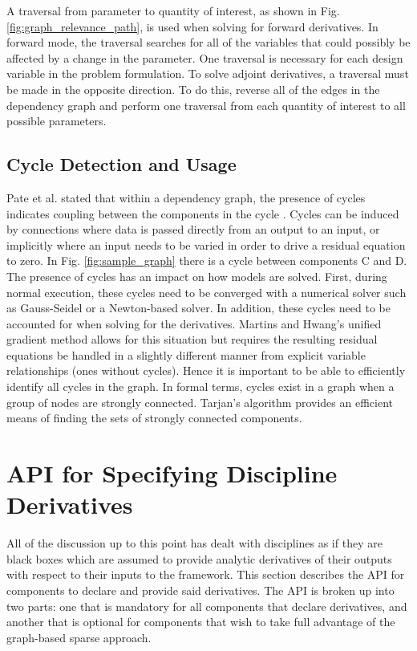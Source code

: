 \documentclass[]{aiaa-tc} %
\begin{document}
        A traversal from parameter to quantity of interest, as shown in Fig. \ref{fig:graph_relevance_path}, is used when solving for
        forward derivatives. In forward mode, the traversal searches for all of the variables that could possibly
        be affected by a change in the parameter. One traversal is necessary for each design variable in the
        problem formulation. To solve adjoint derivatives, a traversal must be made in
        the opposite direction. To do this, reverse all of the edges in the dependency graph and
        perform one traversal from each quantity of interest to all possible parameters.

    \subsection{Cycle Detection and Usage}
        Pate et al. stated that within a dependency graph, the presence of cycles indicates coupling between
        the components in the cycle \cite{graph_problem2013}. Cycles can be induced by connections
        where data is passed directly from an output to an input, or implicitly where an input needs to
        be varied in order to drive a residual equation to zero. In Fig. \ref{fig:sample_graph} there 
        is a cycle between components C and D. The presence of cycles has
        an impact on how models are solved. First, during normal execution, these cycles
        need to be converged with a numerical solver such as Gauss-Seidel or a Newton-based solver.
        In addition, these cycles need to be accounted for when solving for the derivatives. Martins and Hwang's
        unified gradient method allows for this situation but requires the resulting residual equations be
        handled in a slightly different manner from explicit variable relationships (ones without cycles). Hence
        it is important to be able to efficiently identify all cycles in the graph. In formal terms,
        cycles exist in a graph when a group of nodes are strongly connected. Tarjan's algorithm provides
        an efficient means of finding the sets of strongly connected components\cite{tarjan1972depth,nuutila1994finding}.


    \section{API for Specifying Discipline Derivatives}

        All of the discussion up to this point has dealt with disciplines as if they are black boxes
        which are assumed to provide analytic derivatives of their outputs with respect to their inputs
        to the framework. This section describes the API for components to declare and provide
        said derivatives. The API is broken up into two parts: one that is mandatory for all components
        that declare derivatives, and another that is optional for components that wish to take full
        advantage of the graph-based sparse approach.
\end{document}
